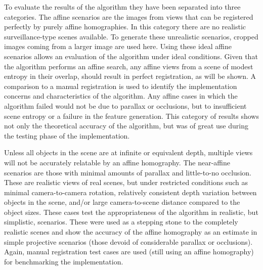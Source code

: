 %
%
%
%
%
%
%
%
%

%
%
%



To evaluate the results of the algorithm they have been separated into three categories. The affine scenarios are the images from views that can be registered perfectly by purely affine homographies. In this category there are no realistic surveillance-type scenes available. To generate these unrealistic scenarios, cropped images coming from a larger image are used here. Using these ideal affine scenarios allows an evaluation of the algorithm under ideal conditions. Given that the algorithm performs an affine search, any affine views from a scene of modest entropy in their overlap, should result in perfect registration, as will be shown. A comparison to a manual registration is used to identify the implementation concerns and characteristics of the algorithm. Any affine cases in which the algorithm failed would not be due to parallax or occlusions, but to insufficient scene entropy or a failure in the feature generation. This category of results shows not only the theoretical accuracy of the algorithm, but was of great use during the testing phase of the implementation.

Unless all objects in the scene are at infinite or equivalent depth, multiple views will not be accurately relatable by an affine homography. The near-affine scenarios are those with minimal amounts of parallax and little-to-no occlusion. These are realistic views of real scenes, but under restricted conditions such as minimal camera-to-camera rotation, relatively consistent depth variation between objects in the scene, and/or large camera-to-scene distance compared to the object sizes. These cases test the appropriateness of the algorithm in realistic, but simplistic, scenarios. These were used as a stepping stone to the completely realistic scenes and show the accuracy of the affine homography as an estimate in simple projective scenarios (\ie{ }those devoid of considerable parallax or occlusions). Again, manual registration test cases are used (still using an affine homography) for benchmarking the implementation.

